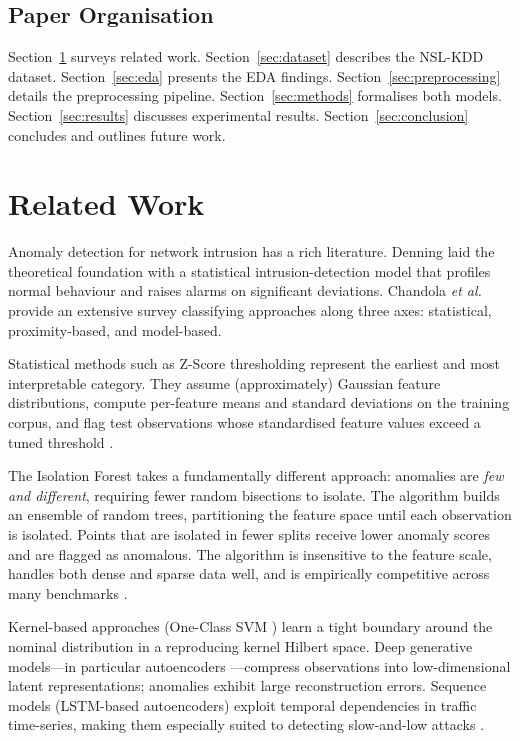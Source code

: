 \documentclass[conference]{IEEEtran}
\begin{document}
\subsection{Paper Organisation}
Section~\ref{sec:related} surveys related work.  Section~\ref{sec:dataset} describes
the NSL-KDD dataset.  Section~\ref{sec:eda} presents the EDA findings.
Section~\ref{sec:preprocessing} details the preprocessing pipeline.
Section~\ref{sec:methods} formalises both models.  Section~\ref{sec:results}
discusses experimental results.  Section~\ref{sec:conclusion} concludes and
outlines future work.

\section{Related Work}
\label{sec:related}

Anomaly detection for network intrusion has a rich literature.  Denning
\cite{denning1987} laid the theoretical foundation with a statistical
intrusion-detection model that profiles normal behaviour and raises alarms on
significant deviations.  Chandola \emph{et al.}\ \cite{chandola2009} provide an
extensive survey classifying approaches along three axes: statistical, proximity-based,
and model-based.

Statistical methods such as Z-Score thresholding represent the earliest and most
interpretable category.  They assume (approximately) Gaussian feature distributions,
compute per-feature means and standard deviations on the training corpus, and flag
test observations whose standardised feature values exceed a tuned threshold
\cite{denning1987}.

The Isolation Forest \cite{liu2008} takes a fundamentally different approach:
anomalies are \emph{few and different}, requiring fewer random bisections to
isolate.  The algorithm builds an ensemble of random trees, partitioning the feature
space until each observation is isolated.  Points that are isolated in fewer splits
receive lower anomaly scores and are flagged as anomalous.  The algorithm is
insensitive to the feature scale, handles both dense and sparse data well, and is
empirically competitive across many benchmarks \cite{liu2008}.

Kernel-based approaches (One-Class SVM \cite{scholkopf2001}) learn a tight
boundary around the nominal distribution in a reproducing kernel Hilbert space.
Deep generative models---in particular autoencoders \cite{sakurada2014}---compress
observations into low-dimensional latent representations; anomalies exhibit large
reconstruction errors.  Sequence models (LSTM-based autoencoders) exploit temporal
dependencies in traffic time-series, making them especially suited to detecting
slow-and-low attacks \cite{chandola2009}.
\end{document}
